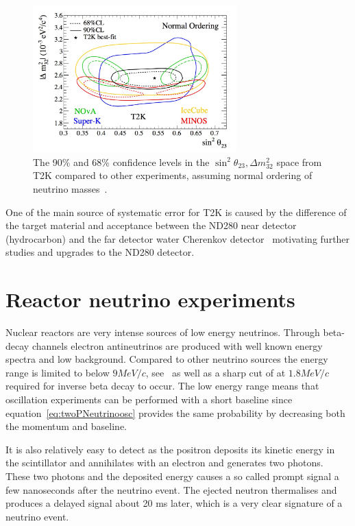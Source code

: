 \begin{figure}[h!]
\centering
  \centering
\includegraphics[width=0.7\textwidth]{figures/t2k2.jpeg}
\vspace{2mm}
\caption{The 90\% and 68\% confidence levels in the $\sin ^2 \theta_{23}, \Delta m^2_{32}$ space from T2K compared to other experiments, assuming normal ordering of neutrino masses~\cite{T2Kfigures}.}
\label{fig:T2K23}
\end{figure}

One of the main source of systematic error for T2K is caused by the difference of the target material and acceptance between the ND280 near detector (hydrocarbon) and the far detector water Cherenkov detector~\cite{T2Kpaper} motivating further studies and upgrades to the ND280 detector.

\pagebreak
\newpage
\section{Reactor neutrino experiments}
Nuclear reactors are very intense sources of low energy neutrinos. Through beta-decay channels electron antineutrinos are produced with well known energy spectra and low background. Compared to other neutrino sources the energy range is limited to below $9 MeV/c$, see~ as well as a sharp cut of at $1.8 MeV/c$ required for inverse beta decay to occur. The low energy range means that oscillation experiments can be performed with a short baseline since equation~\ref{eq:twoPNeutrinoosc} provides the same probability by decreasing both the momentum and baseline.

It is also relatively easy to detect as the positron deposits its kinetic energy in the scintillator and annihilates with an electron and generates two photons. These two photons and the deposited energy causes a so called prompt signal a few nanoseconds after the neutrino event. The ejected neutron thermalises and produces a delayed signal about 20 ms later, which is a very clear signature of a neutrino event. 


